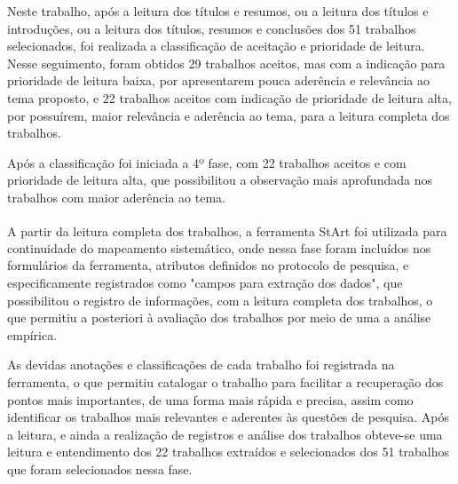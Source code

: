 Neste trabalho, após a leitura dos títulos e resumos, ou a leitura dos títulos e introduções, ou a leitura dos títulos, resumos e conclusões dos 51 trabalhos selecionados, foi realizada a classificação de aceitação e prioridade de leitura. Nesse seguimento, foram obtidos 29 trabalhos aceitos, mas com a indicação para prioridade de leitura baixa, por apresentarem pouca aderência e relevância ao tema proposto, e 22 trabalhos aceitos com indicação de prioridade de leitura alta, por possuírem, maior relevância e aderência ao tema, para a leitura completa dos trabalhos.   

Após a classificação foi iniciada a 4º fase, com 22 trabalhos aceitos e com prioridade de leitura alta, que possibilitou a observação mais aprofundada nos trabalhos com maior aderência ao tema. 

A partir da leitura completa dos trabalhos, a ferramenta \acrshort{StArt}\textsuperscript{\textregistered} foi utilizada para continuidade do mapeamento sistemático, onde nessa fase foram incluídos nos formulários da ferramenta, atributos definidos no protocolo de pesquisa, e especificamente registrados como "campos para extração dos dados", que possibilitou o registro de informações, com a leitura completa dos trabalhos, o  que permitiu a posteriori à avaliação dos trabalhos por meio de uma a análise empírica. 

As devidas anotações e classificações de cada trabalho foi registrada na ferramenta, o que permitiu catalogar o trabalho para facilitar a recuperação dos pontos mais importantes, de uma forma mais rápida e precisa, assim como identificar os trabalhos mais relevantes e aderentes às questões de pesquisa. Após a leitura, e ainda a realização de registros e análise dos trabalhos obteve-se uma leitura e entendimento dos 22 trabalhos extraídos e selecionados dos 51 trabalhos que foram selecionados nessa fase. 

\vspace{30mm}

